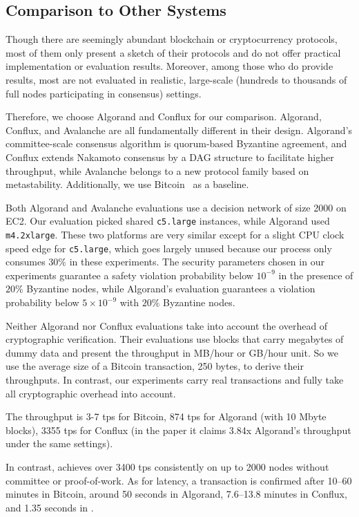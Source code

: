 \subsection{Comparison to Other Systems}%
Though there are seemingly abundant blockchain or cryptocurrency protocols,
most of them only present a sketch of their protocols and do not offer practical implementation or evaluation results.
Moreover, among those who do provide results, most are not evaluated in realistic, large-scale (hundreds to thousands of full nodes participating in consensus) settings.

Therefore, we choose Algorand and Conflux for our comparison. Algorand, Conflux, and Avalanche are all fundamentally different in their
design. Algorand's committee-scale consensus algorithm is quorum-based Byzantine agreement, and Conflux extends Nakamoto consensus by a DAG structure to facilitate higher throughput, while Avalanche belongs to a new protocol family based on metastability. Additionally, we use Bitcoin~\cite{nakamoto2008bitcoin} as a baseline.

Both Algorand and Avalanche evaluations use a decision network of size 2000 on EC2.
Our evaluation picked shared \texttt{c5.large} instances, while Algorand used \texttt{m4.2xlarge}\@.
These two platforms are very similar except for a slight CPU clock speed edge for \texttt{c5.large}, which goes largely unused because our process only consumes $30\%$ in these experiments.
The security parameters chosen in our experiments guarantee a safety violation
probability below $10^{-9}$ in the presence of $20\%$ Byzantine nodes, while
Algorand's evaluation guarantees a violation probability below $5 \times 10^{-9}$ with $20\%$ Byzantine nodes.

Neither Algorand nor Conflux evaluations take into account the overhead of cryptographic verification.
Their evaluations use blocks that carry megabytes of dummy data and present the throughput in MB/hour or GB/hour unit. So we use the average size of a Bitcoin transaction, 250 bytes, to derive their throughputs. In contrast, our experiments carry real transactions and fully take all cryptographic overhead into account.

The throughput is 3-7 tps for Bitcoin,
874 tps for Algorand (with 10 Mbyte blocks),
3355 tps for Conflux (in the paper it claims 3.84x Algorand's throughput under the same settings).

In contrast, {\sysname} achieves over 3400 tps
consistently on up to 2000 nodes without committee or proof-of-work.
As for latency, a transaction is confirmed after 10--60
minutes in Bitcoin, around 50 seconds in Algorand,
7.6--13.8 minutes in Conflux, and 1.35 seconds in {\sysname}.

